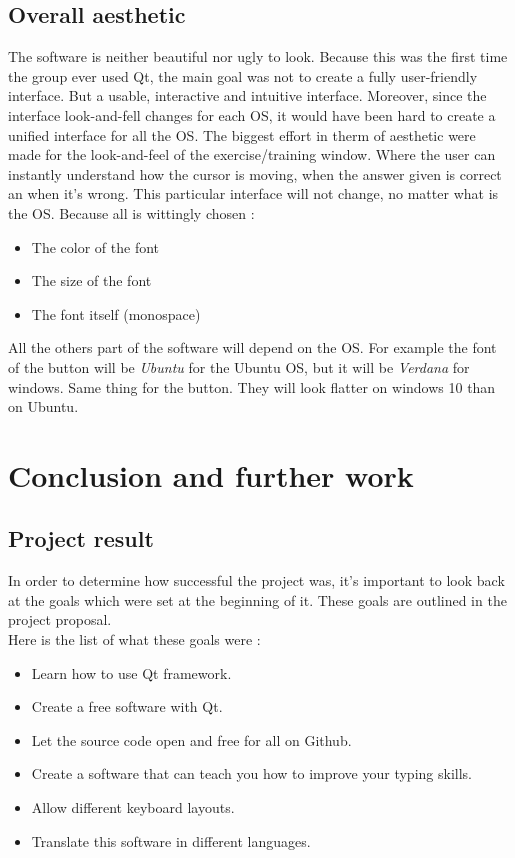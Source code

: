 \chapter{Overall aesthetic}
The software is neither beautiful nor ugly to look. Because this was the first time the group ever used Qt, the main goal was not to create a fully user-friendly interface. But a usable, interactive and intuitive interface. Moreover, since the interface look-and-fell changes for each OS, it would have been hard to create a unified interface for all the OS. The biggest effort in therm of aesthetic were made for the look-and-feel of the exercise/training window. Where the user can instantly understand how the cursor is moving, when the answer given is correct an when it's wrong. This particular interface will not change, no matter what is the OS. Because all is wittingly chosen :
\begin{itemize}
	\item The color of the font
	\item The size of the font
	\item The font itself (monospace)
\end{itemize}
All the others part of the software will depend on the OS. For example the font of the button will be \textit{Ubuntu} for the Ubuntu OS, but it will be \textit{Verdana} for windows. Same thing for the button. They will look flatter on windows 10 than on Ubuntu.


\part{Conclusion and further work}

\chapter{Project result}
In order to determine how successful the project was, it's important to look back at the goals which were set at the beginning of it. These goals are outlined in the project proposal.\\
Here is the list of what these goals were :

\begin{itemize}
	\item Learn how to use Qt framework.
	\item Create a free software with Qt.
	\item Let the source code open and free for all on Github.
	\item Create a software that can teach you how to improve your typing skills.
	\item Allow different keyboard layouts.
	\item Translate this software in different languages.
\end{itemize}


